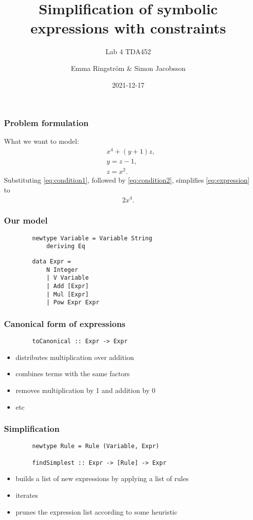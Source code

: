\documentclass[english, 12pt, t, aspectratio=169]{beamer}
\title{Simplification of symbolic expressions with constraints}
\subtitle{Lab 4 TDA452}
\institute{Chalmers University of Technology}
\author{Emma Ringström \& Simon Jacobsson}
\date{2021-12-17}
\begin{document}
\begin{frame}
	\titlepage
\end{frame}

\begin{frame}[t]
	\frametitle{Problem formulation}
	What we want to model:
	\begin{align}
		&x^4 + (y + 1) z, \label{eq:expression}\\
		&y = z - 1, \label{eq:condition1}\\
		&z = x^2. \label{eq:condition2}
	\end{align}
	Substituting \eqref{eq:condition1}, followed by \eqref{eq:condition2}, simplifies \eqref{eq:expression} to
	\begin{align}
		2 x^4.
	\end{align}
	
\end{frame}

\begin{frame}[fragile]
	\frametitle{Our model}
	\begin{verbatim}
		newtype Variable = Variable String
		    deriving Eq
	\end{verbatim}
	\begin{verbatim}
		data Expr =
		    N Integer
		    | V Variable
		    | Add [Expr]
		    | Mul [Expr]
		    | Pow Expr Expr
	\end{verbatim}
	
\end{frame}
\begin{frame}[fragile]
	\frametitle{Canonical form of expressions}
	\begin{verbatim}
		toCanonical :: Expr -> Expr
	\end{verbatim}
	\begin{itemize}
		\item distributes multiplication over addition
		\item combines terms with the same factors
		\item removes multiplication by 1 and addition by 0
		\item etc
	\end{itemize}
\end{frame}
\begin{frame}[fragile]
	\frametitle{Simplification}
	\begin{verbatim}
		newtype Rule = Rule (Variable, Expr)

		findSimplest :: Expr -> [Rule] -> Expr
	\end{verbatim}

	\begin{itemize}
		\item builds a list of new expressions by applying a list of rules
		\item iterates
		\item prunes the expression list according to some heuristic
	\end{itemize}
\end{frame}
\end{document}
